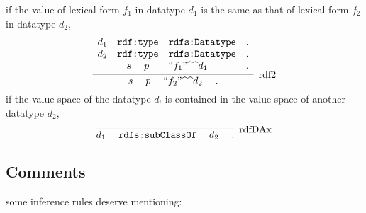 \documentclass{article}
\DeclareMathOperator{\s}{\phantom{ab}}
\newcommand{\ttri}[3]{#1 \s #2 \s #3 \s.}
\newcommand{\ttp}[2]{\texttt{#1:#2}}
\DeclareMathOperator{\subc}{\ttp{rdfs}{subClassOf}}
\DeclareMathOperator{\type}{\ttp{rdf}{type}}
\begin{document}
\begin{description}
\[\]
\[\]
if the value of lexical form $f_1$ in datatype $d_1$ is the same as that of lexical form $f_2$ in datatype $d_2$, 
\[
\infer[\mathrm{rdf2}]{\ttri{s}{p}{``f_2"\text{\textasciicircum\textasciicircum}d_2}}
{\begin{array}{ccll}
d_1 & \type &  \ttp{rdfs}{Datatype}& .\\
d_2 & \type & \ttp{rdfs}{Datatype}&.\\
 &s\s p & ``f_1"\text{\textasciicircum\textasciicircum}d_1 & .
\end{array}}
\]
\[\]
if the value space of the datatype $d_!$ is contained in the value space of another  datatype $d_2$, 
\[
\infer[\mathrm{rdfDAx}]{\ttri{d_1}{\subc}{d_2}}{}
\]
\end{description}

\subsection{Comments}
\noindent some inference rules deserve mentioning:
\end{document}
